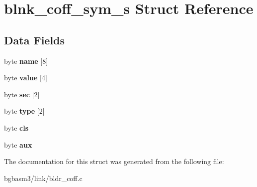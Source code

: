 \hypertarget{structblnk__coff__sym__s}{\section{blnk\-\_\-coff\-\_\-sym\-\_\-s Struct Reference}
\label{structblnk__coff__sym__s}
}
\subsection*{Data Fields}
\begin{DoxyCompactItemize}
\item 
\hypertarget{structblnk__coff__sym__s_ac468527bb1bbf8a194f23ac2564616cc}{byte {\bfseries name} \mbox{[}8\mbox{]}}\label{structblnk__coff__sym__s_ac468527bb1bbf8a194f23ac2564616cc}

\item 
\hypertarget{structblnk__coff__sym__s_a922948cdc68bae96868167822f166635}{byte {\bfseries value} \mbox{[}4\mbox{]}}\label{structblnk__coff__sym__s_a922948cdc68bae96868167822f166635}

\item 
\hypertarget{structblnk__coff__sym__s_a3cc34e79548fa2d78c7cf1ec908c7631}{byte {\bfseries sec} \mbox{[}2\mbox{]}}\label{structblnk__coff__sym__s_a3cc34e79548fa2d78c7cf1ec908c7631}

\item 
\hypertarget{structblnk__coff__sym__s_a5da9d41682975c0397d0a8e26fc4d9e3}{byte {\bfseries type} \mbox{[}2\mbox{]}}\label{structblnk__coff__sym__s_a5da9d41682975c0397d0a8e26fc4d9e3}

\item 
\hypertarget{structblnk__coff__sym__s_a6849a1d517c821d3965e0a907a191b35}{byte {\bfseries cls}}\label{structblnk__coff__sym__s_a6849a1d517c821d3965e0a907a191b35}

\item 
\hypertarget{structblnk__coff__sym__s_aa64b0ce16172159bdca58f2966c60da7}{byte {\bfseries aux}}\label{structblnk__coff__sym__s_aa64b0ce16172159bdca58f2966c60da7}

\end{DoxyCompactItemize}


The documentation for this struct was generated from the following file\-:\begin{DoxyCompactItemize}
\item 
bgbasm3/link/bldr\-\_\-coff.\-c\end{DoxyCompactItemize}
